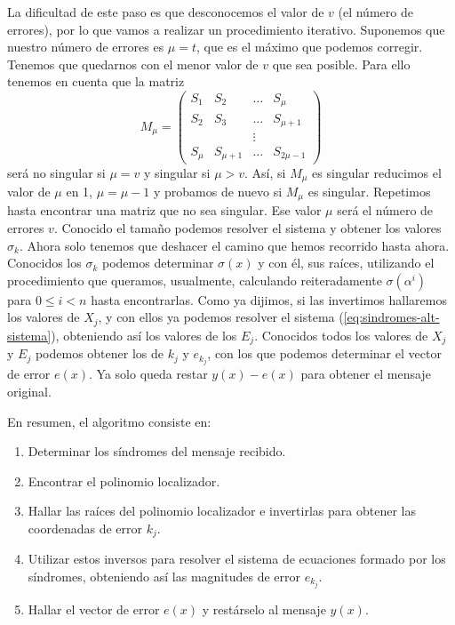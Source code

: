 La dificultad de este paso es que desconocemos el valor de \(v\) (el número de errores), por lo que vamos a realizar un procedimiento iterativo.
Suponemos que nuestro número de errores es \(\mu = t\), que es el máximo que podemos corregir.
Tenemos que quedarnos con el menor valor de \(v\) que sea posible.
Para ello tenemos en cuenta que la matriz
\[
  M_{\mu} = \begin{pmatrix}
    S_1 & S_2 & \dots & S_{\mu} \\
    S_2 & S_3 & \dots & S_{\mu + 1}\\
     & & \vdots & \\
    S_{\mu} & S_{\mu+1} & \dots & S_{2\mu - 1}
  \end{pmatrix}
\] será no singular si \(\mu = v\) y singular si \(\mu > v\).
Así, si \(M_{\mu}\) es singular reducimos el valor de \(\mu\) en 1, \(\mu = \mu - 1\) y probamos de nuevo si \(M_{\mu}\) es singular.
Repetimos hasta encontrar una matriz que no sea singular.
Ese valor \(\mu\) será el número de errores \(v\).
Conocido el tamaño podemos resolver el sistema y obtener los valores \(\sigma_k\).
Ahora solo tenemos que deshacer el camino que hemos recorrido hasta ahora.
Conocidos los \(\sigma_k\) podemos determinar \(\sigma(x)\) y con él, sus raíces, utilizando el procedimiento que queramos, usualmente, calculando reiteradamente \(\sigma(\alpha^i)\) para \(0 \leq i < n\) hasta encontrarlas.
Como ya dijimos, si las invertimos hallaremos los valores de \(X_j\), y con ellos ya podemos resolver el sistema (\ref{eq:sindromes-alt-sistema}), obteniendo así los valores de los \(E_j\).
Conocidos todos los valores de \(X_j\) y \(E_j\) podemos obtener los de \(k_j\) y \(e_{k_j}\), con los que podemos determinar el vector de error \(e(x)\).
Ya solo queda restar \(y(x) - e(x)\) para obtener el mensaje original.

En resumen, el algoritmo consiste en: \begin{enumerate}
  \item Determinar los síndromes del mensaje recibido.
  \item Encontrar el polinomio localizador.
  \item Hallar las raíces del polinomio localizador e invertirlas para obtener las coordenadas de error \(k_j\).
  \item Utilizar estos inversos para resolver el sistema de ecuaciones formado por los síndromes, obteniendo así las magnitudes de error \(e_{k_j}\).
  \item Hallar el vector de error \(e(x)\) y restárselo al mensaje \(y(x)\).
\end{enumerate}

